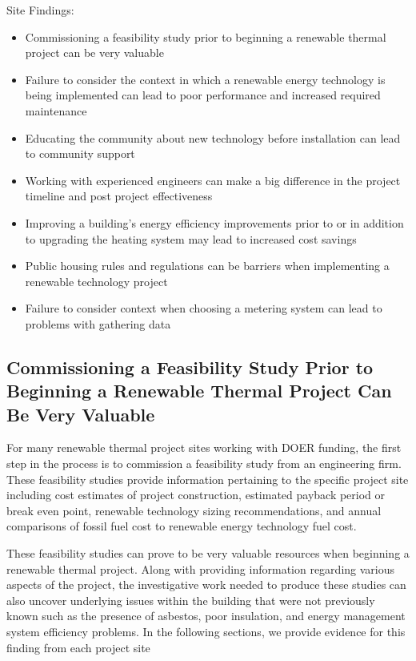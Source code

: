 Site Findings:
  \begin{itemize}
    \item{Commissioning a feasibility study prior to beginning a renewable thermal project can be very valuable}
    \item{Failure to consider the context in which a renewable energy technology is being implemented can lead to poor performance and increased required maintenance}
    \item{Educating the community about new technology before installation can lead to community support}
    \item{Working with experienced engineers can make a big difference in the project timeline and post project effectiveness}
    \item{Improving a building’s energy efficiency improvements prior to or in addition to upgrading the heating system may lead to increased cost savings}
    \item{Public housing rules and regulations can be barriers when implementing a renewable technology project}
    \item{Failure to consider context when choosing a metering system can lead to problems with gathering data}
  \end{itemize}

\subsection{Commissioning a Feasibility Study Prior to Beginning a Renewable Thermal Project Can Be Very Valuable}
\par For many renewable thermal project sites working with DOER funding, the first step in the process is to commission a feasibility study from an engineering firm. These feasibility studies provide information pertaining to the specific project site including cost estimates of project construction, estimated payback period or break even point, renewable technology sizing recommendations, and annual comparisons of fossil fuel cost to renewable energy technology fuel cost.
\par These feasibility studies can prove to be very valuable resources when beginning a renewable thermal project. Along with providing information regarding various aspects of the project, the investigative work needed to produce these studies can also uncover underlying issues within the building that were not previously known such as the presence of asbestos, poor insulation, and energy management system efficiency problems. In the following sections, we provide evidence for this finding from each project site

